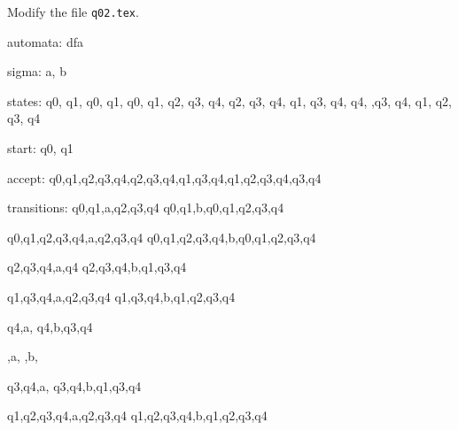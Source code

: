 Modify the file \verb!q02.tex!.

\begin{console}
automata: dfa

sigma: a, b

states: {q0, q1}, {q0, q1}, {q0, q1, q2, q3, q4}, {q2, q3, q4}, 
{q1, q3, q4}, {q4}, {} ,{q3, q4}, {q1, q2, q3, q4}

start: {q0, q1}

accept: {q0,q1,q2,q3,q4},{q2,q3,q4},{q1,q3,q4},{q1,q2,q3,q4},{q3,q4}

transitions:
{q0,q1},a,{q2,q3,q4}
{q0,q1},b,{q0,q1,q2,q3,q4}

{q0,q1,q2,q3,q4},a,{q2,q3,q4}
{q0,q1,q2,q3,q4},b,{q0,q1,q2,q3,q4}

{q2,q3,q4},a,{q4}
{q2,q3,q4},b,{q1,q3,q4}

{q1,q3,q4},a,{q2,q3,q4}
{q1,q3,q4},b,{q1,q2,q3,q4}

{q4},a,{}
{q4},b,{q3,q4}

{},a,{}
{},b,{}

{q3,q4},a,{}
{q3,q4},b,{q1,q3,q4}

{q1,q2,q3,q4},a,{q2,q3,q4}
{q1,q2,q3,q4},b,{q1,q2,q3,q4}
\end{console}
